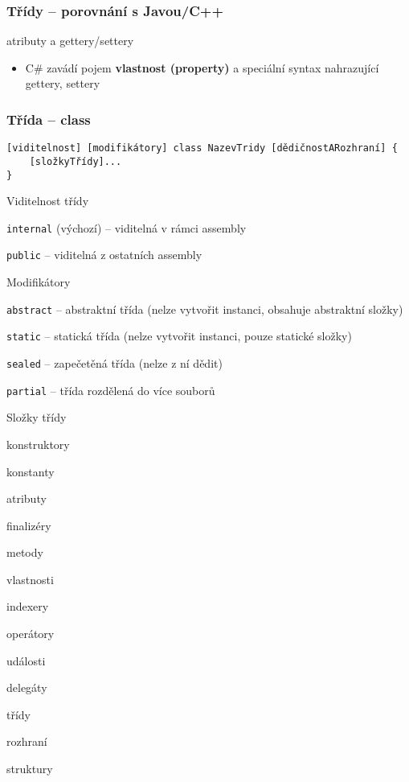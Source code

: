 \begin{frame}[fragile]
\frametitle{Třídy -- porovnání s Javou/C++}
\begin{bitemize}{}
\item atributy a gettery/settery
\begin{itemize}
\item C\# zavádí pojem \textbf{vlastnost (property)} a speciální syntax nahrazující gettery, settery
\end{itemize}
\end{bitemize}
\end{frame}






\begin{frame}[fragile]
\frametitle{Třída -- class}
\vfill
\begin{noteblock}{}
\begin{lstlisting}
[viditelnost] [modifikátory] class NazevTridy [dědičnostARozhraní] { 
	[složkyTřídy]...
}
\end{lstlisting}
\end{noteblock}
\vfill
\begin{bitemize}{Viditelnost třídy}
\item \lstinline|internal| (výchozí) -- viditelná v rámci assembly
\item \lstinline|public| -- viditelná z ostatních assembly
\end{bitemize}
\vfill
\begin{bitemize}{Modifikátory}
\item \lstinline|abstract| -- abstraktní třída (nelze vytvořit instanci, obsahuje abstraktní složky)
\item \lstinline|static| -- statická třída (nelze vytvořit instanci, pouze statické složky)
\item \lstinline|sealed| -- zapečetěná třída (nelze z ní dědit)
\item \lstinline|partial| -- třída rozdělená do více souborů
\end{bitemize}
\vfill
\end{frame}




\begin{frame}[fragile]
\begin{bitemize}{Složky třídy}
\item konstruktory
\item konstanty
\item atributy
\item finalizéry
\item metody
\item vlastnosti
\item indexery
\item operátory
\item události
\item delegáty
\item třídy
\item rozhraní
\item struktury
\end{bitemize}
\end{frame}


